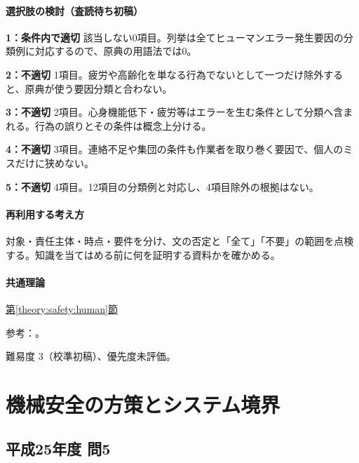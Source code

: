 \paragraph{選択肢の検討（査読待ち初稿）}\mbox{}\par

\noindent\textbf{1：条件内で適切} 該当しない0項目。列挙は全てヒューマンエラー発生要因の分類例に対応するので、原典の用語法では0。\par

\noindent\textbf{2：不適切} 1項目。疲労や高齢化を単なる行為でないとして一つだけ除外すると、原典が使う要因分類と合わない。\par

\noindent\textbf{3：不適切} 2項目。心身機能低下・疲労等はエラーを生む条件として分類へ含まれる。行為の誤りとその条件は概念上分ける。\par

\noindent\textbf{4：不適切} 3項目。連絡不足や集団の条件も作業者を取り巻く要因で、個人のミスだけに狭めない。\par

\noindent\textbf{5：不適切} 4項目。12項目の分類例と対応し、4項目除外の根拠はない。\par

\paragraph{再利用する考え方} 対象・責任主体・時点・要件を分け、文の否定と「全て」「不要」の範囲を点検する。知識を当てはめる前に何を証明する資料かを確かめる。

\paragraph{共通理論} \hyperref[theory:safety:human]{第\ref*{theory:safety:human}節}

\par 参考：\cite{saf53_human12}。

\par 難易度 3（校準初稿）、優先度未評価。

\section{機械安全の方策とシステム境界}

\subsection{平成25年度 問5}
\label{q:h25-reg-apt-05}

